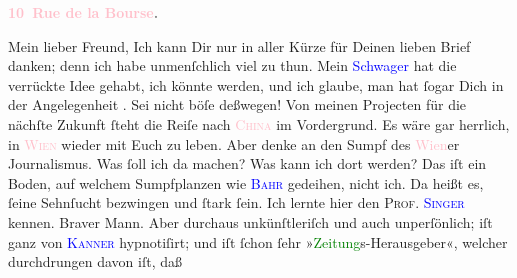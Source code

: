            \pstart
           \begin{otherlanguage}{french}\textcolor{gray}{\textbf{\textbf{\textcolor{pink}{10 Rue de la Bourse}{}\ledrightnote{\textcolor{pink}{rue de la Bourse}}.}}}\end{otherlanguage}\pend
           \pstart\center{}Mein lieber Freund,\pend\pstart
           Ich kann Dir nur in aller Kürze für Deinen lieben Brief danken; denn ich habe
               unmenſchlich viel zu thun.\pend
           \pstart
           Mein \textcolor{blue}{Schwager}{} hat die
               verrückte Idee gehabt, ich könnte \label{K_L02836-1v}\label{K_L02836-1h} werden, und ich glaube, man hat ſogar Dich in der Angelegenheit \label{K_L02836-12v}\label{K_L02836-12h}. Sei nicht böſe deßwegen!\pend
           \pstart
           Von meinen Projecten für die nächſte Zukunft ſteht die Reiſe nach \textsc{\textcolor{pink}{China}{}\ledrightnote{\textcolor{pink}{China}}} im Vordergrund. Es wäre gar herrlich, in \textsc{\textcolor{pink}{Wien}{}\ledrightnote{\textcolor{pink}{Wien}}} wieder mit Euch zu leben. Aber denke an den Sumpf des \textcolor{pink}{Wien}{}\ledrightnote{\textcolor{pink}{Wien}}er Journalismus. {\pb}Was ſoll
               ich da machen? Was kann ich dort werden? Das iſt ein Boden, auf welchem Sumpfplanzen
               wie \textsc{\textcolor{blue}{Bahr}{}\ledrightnote{\textcolor{blue}{Hermann Bahr}}} gedeihen, nicht ich. Da heißt es, ſeine Sehnſucht bezwingen und ſtark ſein.\pend
           \pstart
           Ich lernte hier den \textsc{Prof. 
                  \textcolor{blue}{Singer}{}\ledrightnote{\textcolor{blue}{Isidor Singer}}} kennen. Braver Mann. Aber durchaus unkünſtleriſch und auch unperſönlich; iſt
               ganz von \textsc{\textcolor{blue}{Kanner}{}\ledrightnote{\textcolor{blue}{Heinrich Kanner}}} hypnotiſirt; und iſt ſchon ſehr »\textcolor{green}{Zeitung}{}s-Herausgeber«, welcher durchdrungen davon iſt, daß
